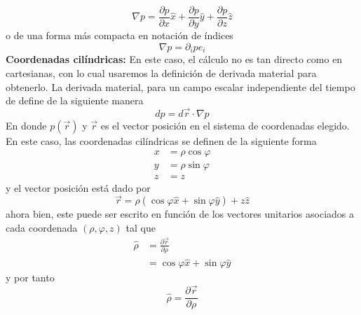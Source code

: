 \documentclass[11pt,letterpaper]{article}
\begin{document}
\begin{equation}
    \nabla p = \frac{\partial p}{\partial x}\hat{x} + \frac{\partial p}{\partial y}\hat{y} + \frac{\partial p}{\partial z}\hat{z} 
\end{equation}
o de una forma más compacta en notación de índices
\begin{equation}
    \nabla p = \partial_i p \hat{e_i}
\end{equation}
\textbf{Coordenadas cilíndricas:} En este caso, el cálculo no es tan directo como en cartesianas, con lo cual usaremos la definición de derivada material para obtenerlo. La derivada material, para un campo escalar independiente del tiempo de define de la siguiente manera
\begin{equation}
    dp=d\vec{r}\cdot \nabla p
\end{equation}
En donde $p(\vec{r})$ y $\vec{r}$ es el vector posición en el sistema de coordenadas elegido. En este caso, las coordenadas cilíndricas se definen de la siguiente forma
\begin{align*}
    x & =\rho\cos{\varphi} \\
    y & = \rho \sin{\varphi} \\
    z & = z
\end{align*}
y el vector posición está dado por
\begin{equation}
    \vec{r}=\rho(\cos{\varphi}\hat{x} + \sin{\varphi}\hat{y})+z\hat{z}
\end{equation}
ahora bien, este puede ser escrito en función de los vectores unitarios asociados a cada coordenada $(\rho,\varphi,z)$ tal que
\begin{align*}
    \hat{\rho}& =\frac{\partial \vec{r}}{\partial \rho} \\
& = \cos{\varphi}\hat{x} + \sin{\varphi}\hat{y}
\end{align*}
y por tanto
\begin{equation}
    \hat{\rho} = \frac{\partial \vec{r}}{\partial \rho }
\end{equation}
\end{document}
